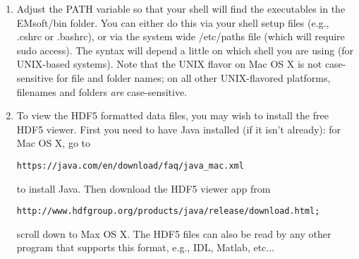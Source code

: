 \documentclass[DIV=calc, paper=letter, fontsize=11pt]{scrartcl}	 %
\begin{document}
\begin{enumerate}
\item Adjust the PATH variable so that your shell will find the executables in the \textsf{EMsoft/bin} folder.  You can either do this via your shell setup files (e.g., \textsf{.cshrc}
or \textsf{.bashrc}), or via the system wide \textsf{/etc/paths} file (which will require \textsf{sudo} access).
The syntax will depend a little on which shell you are using (for UNIX-based systems).  Note that the UNIX flavor on Mac OS X 
is not case-sensitive for file and folder names; on all other UNIX-flavored platforms, filenames and folders \textit{are}
case-sensitive.

\item To view the HDF5 formatted data files, you may wish to install the free HDF5 viewer.  First you need to have Java installed (if it isn't already):
for Mac OS X, go to 
\begin{verbatim}
https://java.com/en/download/faq/java_mac.xml
\end{verbatim}
to install Java.  Then download the HDF5 viewer app from
\begin{verbatim}
http://www.hdfgroup.org/products/java/release/download.html;
\end{verbatim}
scroll down to Max OS X.
The HDF5 files can also be read by any other program that supports this format, e.g., IDL, Matlab, etc...
\end{enumerate}


\newpage
\end{document}
